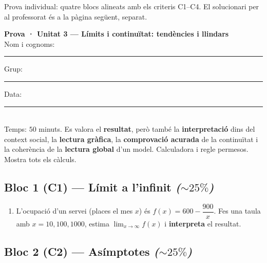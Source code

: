 %
{Prova individual: quatre blocs alineats amb els criteris C1–C4. El solucionari per al professorat és a la pàgina següent, separat.}

\begin{tcolorbox}[colback=white, colframe=udnavy, boxrule=0.8pt, arc=2pt,
  left=8pt, right=8pt, top=6pt, bottom=6pt]
\textbf{Prova · Unitat 3 — Límits i continuïtat: tendències i llindars}\\[4pt]
Nom i cognoms: \rule{6.5cm}{0.4pt} \quad Grup: \rule{1.6cm}{0.4pt} \quad Data: \rule{2.2cm}{0.4pt}\\[6pt]
\small Temps: $50$ minuts. Es valora el \textbf{resultat}, però també la
\textbf{interpretació} dins del context social, la \textbf{lectura gràfica}, la
\textbf{comprovació acurada} de la continuïtat i la coherència de la \textbf{lectura
global} d'un model. Calculadora i regle permesos. Mostra tots els càlculs.
\end{tcolorbox}

\vspace{0.4em}

\subsection*{Bloc 1 (C1) — Límit a l'infinit \hfill \normalfont\itshape ($\sim 25\%$)}

\begin{enumerate}[label=\textbf{\arabic*.}, leftmargin=2em, itemsep=7pt]
  \item L'ocupació d'un servei (places el mes $x$) és $f(x)=600-\dfrac{900}{x}$.
        Fes una taula amb $x=10,100,1000$, estima $\displaystyle\lim_{x\to\infty}f(x)$
        i \textbf{interpreta} el resultat.
\end{enumerate}

\subsection*{Bloc 2 (C2) — Asímptotes \hfill \normalfont\itshape ($\sim 25\%$)}

